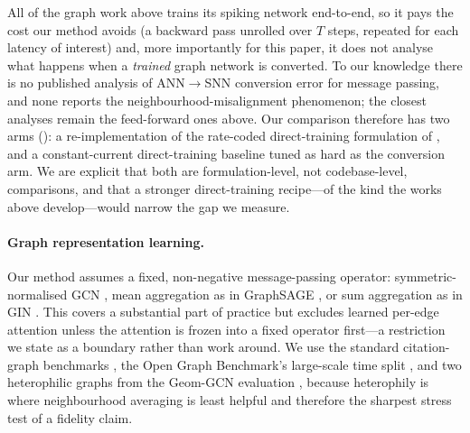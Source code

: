 All of the graph work above trains its spiking network end-to-end, so it pays the cost our method
avoids (a backward pass unrolled over $T$ steps, repeated for each latency of interest) and, more
importantly for this paper, it does not analyse what happens when a \emph{trained} graph network is
converted. To our knowledge there is no published analysis of ANN$\rightarrow$SNN conversion error
for message passing, and none reports the neighbourhood-misalignment phenomenon; the closest
analyses remain the feed-forward ones above. Our comparison therefore has two arms
(): a re-implementation of the rate-coded direct-training formulation of
\citet{zhu2022spiking}, and a constant-current direct-training baseline tuned as hard as the
conversion arm. We are explicit that both are formulation-level, not codebase-level,
comparisons, and that a stronger direct-training recipe---of the kind the works above
develop---would narrow the gap we measure.

\paragraph{Graph representation learning.}
Our method assumes a fixed, non-negative message-passing operator: symmetric-normalised GCN
\citep{kipf2017semi}, mean aggregation as in GraphSAGE \citep{hamilton2017inductive}, or sum
aggregation as in GIN \citep{xu2019powerful}. This covers a substantial part of practice but excludes
learned per-edge attention \citep{velickovic2018graph} unless the attention is frozen into a fixed
operator first---a restriction we state as a boundary rather than work around. We use the standard
citation-graph benchmarks \citep{kipf2017semi}, the Open Graph Benchmark's large-scale time split
\citep{hu2020open}, and two heterophilic graphs from the Geom-GCN evaluation
\citep{pei2020geom,rozemberczki2021multi}, because heterophily is where neighbourhood averaging is
least helpful and therefore the sharpest stress test of a fidelity claim.
